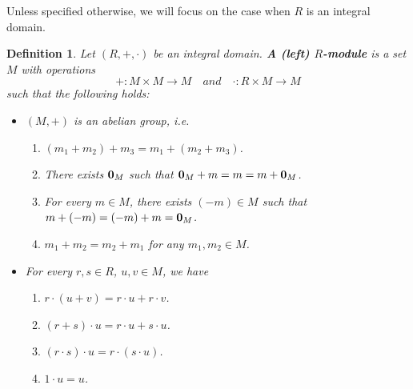 \documentclass[12pt]{amsbook}
\newtheorem{definition}[theorem]{Definition}
\begin{document}
Unless specified otherwise, we will focus on the case when $R$ is an integral domain.


\begin{definition} \label{def-module}
    Let $(R,+,\cdot)$ be an integral domain. {\bf A (left) $R$-module} is a set $M$ with operations
    $$+: M \times M \to M \quad and \quad \cdot : R \times M \to M$$
    such that the following holds:
    \begin{itemize}
        \item $(M,+)$ is an abelian group, i.e.
            \begin{enumerate}
                \item $(m_1+m_2)+m_3 = m_1+(m_2+m_3)$.
                \item There exists ${\bf 0}_{M}$ such that ${\bf 0}_{M}+m = m = m+{\bf 0}_{M}$.
                \item For every $m \in M$, there exists $(-m) \in M$ such that $m+(-m) = (-m)+m = {\bf 0}_{M}$.
                \item $m_1+m_2 = m_2+m_1$ for any $m_1, m_2 \in M$.
            \end{enumerate}
        \item For every $r,s \in R$, $u,v \in M$, we have
            \begin{enumerate}
                \item[(5)] $r \cdot (u+v) = r \cdot u + r \cdot v$.
                \item[(6)] $(r+s) \cdot u = r \cdot u + s \cdot u$.
                \item[(7)] $(r \cdot s) \cdot u = r \cdot (s \cdot u)$.
                \item[(8)] $1 \cdot u = u$.
            \end{enumerate}
    \end{itemize}
\end{definition}
\end{document}
